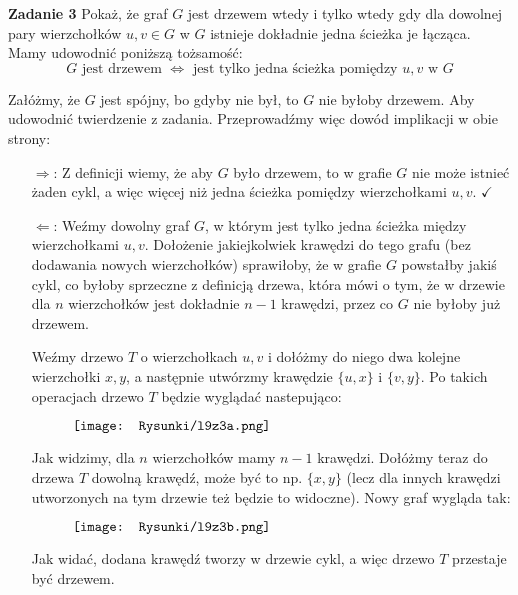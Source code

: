 \documentclass[a4paper,12pt]{article}
\begin{document}
\newpage
\noindent \textbf{Zadanie 3} \newline
Pokaż, że graf $G$ jest drzewem wtedy i tylko wtedy gdy dla dowolnej pary
wierzchołków $u, v \in G$ w $G$ istnieje dokładnie jedna ścieżka je łącząca. \\


\noindent Mamy udowodnić poniższą tożsamość:
\[  
    G \text{ jest drzewem } \Longleftrightarrow 
    \text{ jest tylko jedna ścieżka pomiędzy } u, v \text{ w } G
\]

\noindent Załóżmy, że $G$ jest spójny, bo gdyby nie był, to $G$ nie byłoby drzewem.
Aby udowodnić twierdzenie z zadania. Przeprowadźmy więc dowód implikacji w obie strony:
\begin{itemize}
    \item [$\Longrightarrow$:] Z definicji wiemy, że aby $G$ było drzewem, to
    w grafie $G$ nie może istnieć żaden cykl, a więc więcej niż jedna ścieżka
    pomiędzy wierzchołkami $u, v$. $\checkmark$
    \item [$\Longleftarrow$:] Weźmy dowolny graf $G$, w którym jest tylko jedna
    ścieżka między wierzchołkami $u, v$. Dołożenie jakiejkolwiek krawędzi do tego
    grafu (bez dodawania nowych wierzchołków) sprawiłoby, że w grafie $G$ powstałby
    jakiś cykl, co byłoby sprzeczne z definicją drzewa, która mówi o tym, że w drzewie
    dla $n$ wierzchołków jest dokładnie $n-1$ krawędzi, przez co $G$ nie byłoby już 
    drzewem. 

    Weźmy drzewo $T$ o wierzchołkach $u, v$ i dołóżmy do niego dwa kolejne wierzchołki
    $x, y$, a następnie utwórzmy krawędzie $\{ u, x \}$ i $\{ v, y \}$. Po takich
    operacjach drzewo $T$ będzie wyglądać nastepująco: 
    \begin{figure}[H]
        \centering
        $\vcenter{\hbox{\texttt{[image: Rysunki/l9z3a.png]}}}$
    \end{figure}

    \noindent Jak widzimy, dla $n$ wierzchołków mamy $n-1$ krawędzi. Dołóżmy teraz
    do drzewa $T$ dowolną krawędź, może być to np. $\{ x, y \}$ (lecz dla innych
    krawędzi utworzonych na tym drzewie też będzie to widoczne). Nowy graf wygląda tak:
    \begin{figure}[H]
        \centering
        $\vcenter{\hbox{\texttt{[image: Rysunki/l9z3b.png]}}}$
    \end{figure}

    \noindent Jak widać, dodana krawędź tworzy w drzewie cykl, a więc drzewo $T$
    przestaje być drzewem.
\end{itemize}
\end{document}
